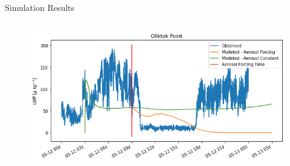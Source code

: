 \documentclass[final]{beamer}
\newlength{\twocolwid}
\begin{document}
\begin{frame}[t]
\begin{columns}[t]
\begin{column}{\twocolwid}



	\begin{alertblock}{Simulation Results}
		\begin{column}{0.59\linewidth}
			\begin{figure}
				\centering
				\includegraphics[width=\linewidth]{images/oli_lwp.png}

				\vspace{2em}


\end{figure}
\end{column}
\end{alertblock}
\end{column}
\end{columns}
\end{frame}
\end{document}
